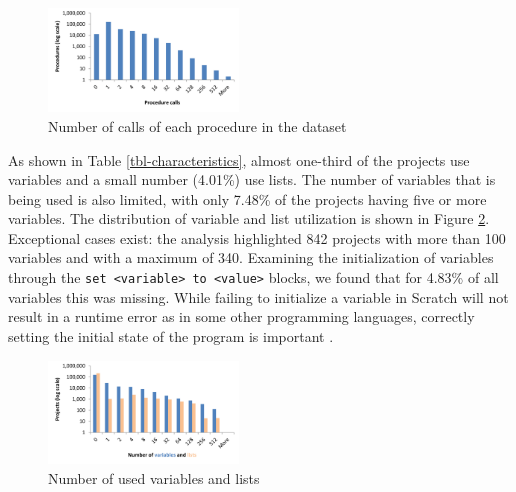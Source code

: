 \documentclass{sig-alternate-05-2015}
\begin{document}
\begin{figure}
	\centering
	\includegraphics[width=0.45\textwidth]{fig/charts/7procedurecalls}
	\vspace{-1em}
	\caption{Number of calls of each procedure in the dataset}
	\label{fig:procedurecalls}
\end{figure}

As shown in Table \ref{tbl-characteristics}, almost one-third of the projects use variables and a small number (4.01\%) use lists. The number of variables that is being used is also limited, with only 7.48\% of the projects having five or more variables. The distribution of variable and list utilization is shown in Figure \ref{fig:variables}. Exceptional cases exist: the analysis highlighted 842 projects with more than 100 variables and with a maximum of 340. Examining the initialization of variables through the \texttt{set <variable> to <value>} blocks, we found that for 4.83\% of all variables this was missing. While failing to initialize a variable in Scratch will not result in a runtime error as in some other programming languages, correctly setting the initial state of the program is important \cite{boe_hairball:_2013}.


\begin{figure}
	\centering
	\includegraphics[width=0.45\textwidth]{fig/charts/8variableslists}
	\vspace{-1em}
	\caption{Number of used variables and lists}
	\label{fig:variables}
\end{figure}
\end{document}
